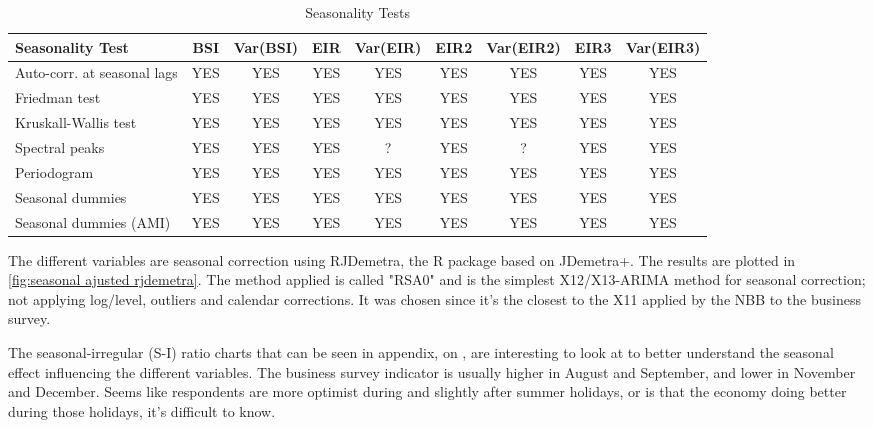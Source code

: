 \documentclass[12pt,a4paper,oneside]{book}
\begin{document}
\begin{table}[htp!]
    \caption{Seasonality Tests}
    \label{tab:Seasonality Tests}
    \centering \footnotesize
    \begin{tabular}{l|c|c|c|c|c|c|c|c}
\textbf{Seasonality Test} & BSI & Var(BSI) & EIR & Var(EIR) & EIR2 & Var(EIR2) & EIR3 & Var(EIR3) \\ \hline
Auto-corr. at seasonal lags& YES & YES & YES & YES & YES & YES & YES & YES \\
Friedman test       & YES   & YES & YES & YES & YES & YES & YES & YES \\
Kruskall-Wallis test & YES   & YES & YES & YES & YES & YES & YES & YES \\
Spectral peaks                  & YES   & YES & YES & ? & YES & ? & YES & YES \\
Periodogram                     & YES   & YES & YES & YES & YES & YES & YES & YES \\
Seasonal dummies                & YES   & YES & YES & YES & YES & YES & YES & YES \\
Seasonal dummies (AMI)          & YES   & YES & YES & YES & YES & YES & YES & YES \\
    \end{tabular}
\end{table}



The different variables are seasonal correction using RJDemetra, the R package based on JDemetra+.
The results are plotted in \autoref{fig:seasonal ajusted rjdemetra}.
The method applied is called "RSA0" and is the simplest X12/X13-ARIMA method for seasonal correction; not applying log/level, outliers and calendar corrections.
It was chosen since it's the closest to the X11 applied by the NBB to the business survey.



The seasonal-irregular (S-I) ratio charts that can be seen in appendix, on , are interesting to look at to better understand the seasonal effect influencing the different variables.
The business survey indicator is usually higher in August and September, and lower in November and December. 
Seems like respondents are more optimist during and slightly after summer holidays, or is that the economy doing better during those holidays, it's difficult to know.
\end{document}
